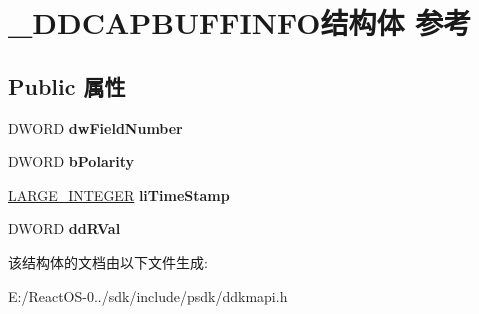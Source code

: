 \hypertarget{struct___d_d_c_a_p_b_u_f_f_i_n_f_o}{}\section{\+\_\+\+D\+D\+C\+A\+P\+B\+U\+F\+F\+I\+N\+F\+O结构体 参考}
\label{struct___d_d_c_a_p_b_u_f_f_i_n_f_o}
\subsection*{Public 属性}
\begin{DoxyCompactItemize}
\item 
\mbox{\label{struct___d_d_c_a_p_b_u_f_f_i_n_f_o_a741459e797ee56e8402e5cfdb6cc3110}} 
D\+W\+O\+RD {\bfseries dw\+Field\+Number}
\item 
\mbox{\label{struct___d_d_c_a_p_b_u_f_f_i_n_f_o_a8d70804c712735094d86139be1d79558}} 
D\+W\+O\+RD {\bfseries b\+Polarity}
\item 
\mbox{\label{struct___d_d_c_a_p_b_u_f_f_i_n_f_o_a978a4129e1cf0502f27d242c3a9d518b}} 
\hyperlink{union___l_a_r_g_e___i_n_t_e_g_e_r}{L\+A\+R\+G\+E\+\_\+\+I\+N\+T\+E\+G\+ER} {\bfseries li\+Time\+Stamp}
\item 
\mbox{\label{struct___d_d_c_a_p_b_u_f_f_i_n_f_o_a4ecc75a16eea28b7a12cf9328f1f6168}} 
D\+W\+O\+RD {\bfseries dd\+R\+Val}
\end{DoxyCompactItemize}


该结构体的文档由以下文件生成\+:\begin{DoxyCompactItemize}
\item 
E\+:/\+React\+O\+S-\/0../sdk/include/psdk/ddkmapi.\+h\end{DoxyCompactItemize}
